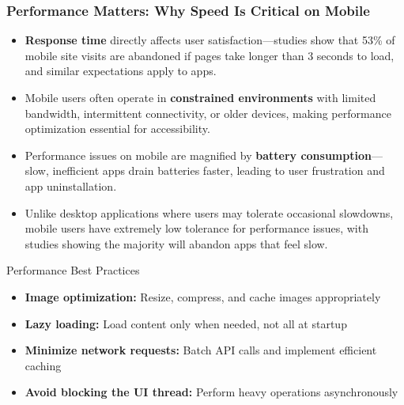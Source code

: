 \documentclass{beamer}
\begin{document}
	\begin{frame}
		\frametitle{Performance Matters: Why Speed Is Critical on Mobile}
		
		\begin{itemize}
			\item \textbf{Response time} directly affects user satisfaction—studies show that 53\% of mobile site visits are abandoned if pages take longer than 3 seconds to load, and similar expectations apply to apps.
			\item Mobile users often operate in \textbf{constrained environments} with limited bandwidth, intermittent connectivity, or older devices, making performance optimization essential for accessibility.
			\item Performance issues on mobile are magnified by \textbf{battery consumption}—slow, inefficient apps drain batteries faster, leading to user frustration and app uninstallation.
			\item Unlike desktop applications where users may tolerate occasional slowdowns, mobile users have extremely low tolerance for performance issues, with studies showing the majority will abandon apps that feel slow.
		\end{itemize}
		
		\begin{alertblock}{\scriptsize{Performance Best Practices}}
			\scriptsize{
				\begin{itemize}
					\item \textbf{Image optimization:} Resize, compress, and cache images appropriately
					\item \textbf{Lazy loading:} Load content only when needed, not all at startup
					\item \textbf{Minimize network requests:} Batch API calls and implement efficient caching
					\item \textbf{Avoid blocking the UI thread:} Perform heavy operations asynchronously
				\end{itemize}
			}
		\end{alertblock}
		
	\end{frame}
	
\end{document}
